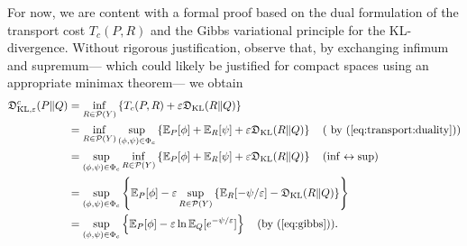 \documentclass{amsart}
\theoremstyle{definition}
\theoremstyle{remark}
\numberwithin{equation}{section}
\begin{document}
For now, we are content with a formal proof based on the dual formulation of the transport cost $T_c(P,R)$ and the  Gibbs variational principle for the KL-divergence. Without rigorous justification, observe that, by exchanging infimum and supremum--- which could likely be justified for compact spaces using an appropriate minimax theorem---
we obtain
\begin{equation}\label{eq:formal proof}
\begin{aligned}
\mathfrak{D}_{\mathrm{KL},\varepsilon}^{c}(P\|Q)&=
\inf_{R\in\mathcal{P}(Y)} \left\{ T_c(P,R) + \varepsilon \mathfrak{D}_{\textrm{KL}}(R\|Q) \right\} \\
&=\inf_{R\in\mathcal{P}(Y)}\sup_{(\phi,\psi)\in \Phi_c}\left\{\mathbb{E}_P[\phi]+\mathbb{E}_{R}[\psi] + \varepsilon \mathfrak{D}_{\textrm{KL}}(R\|Q)\right\} \quad (\textrm{ by } (\ref{eq:transport:duality})) \nonumber \\
&= \sup_{(\phi,\psi)\in \Phi_c} 
\inf_{R\in\mathcal{P}(Y)}
\left\{ 
\mathbb{E}_P[\phi] + \mathbb{E}_{R}[\psi] + \varepsilon \mathfrak{D}_{\textrm{KL}}(R\|Q) \right\} 
\quad 
(\inf \leftrightarrow \sup) 
\nonumber  \\
&= \sup_{(\phi,\psi)\in \Phi_c}
\left\{  
\mathbb{E}_P[\phi] - \varepsilon \sup_{R\in\mathcal{P}(Y)} 
\left\{ 
\mathbb{E}_{R}[-\psi/\varepsilon] -  \mathfrak{D}_{\textrm{KL}}(R\|Q)
\right\} \right\}
\nonumber  \\
&= 
\sup_{(\phi,\psi)\in \Phi_c}
\left\{ \mathbb{E}_P[\phi]  -\varepsilon \ln \mathbb{E}_Q[e^{-\psi/\varepsilon}]\right\}\quad 
(\textrm{by } (\ref{eq:gibbs})). 
\end{aligned}
\end{equation}
\end{document}
